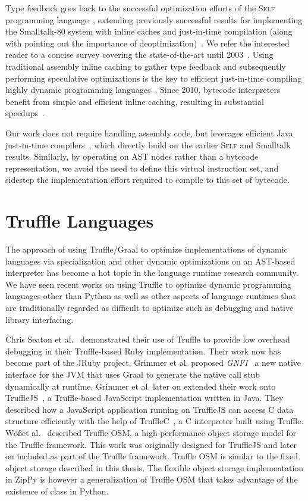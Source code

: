Type feedback goes back to the successful optimization efforts of the \textsc{Self} programming language~\cite{holzle.ungar+94,holzle+94}, extending previously successful results for implementing the Smalltalk-80 system with inline caches and just-in-time compilation (along with pointing out the importance of deoptimization)~\cite{Deutsch1984}.
We refer the interested reader to a concise survey covering the state-of-the-art until 2003~\cite{aycock+03}.
Using traditional assembly inline caching to gather type feedback and subsequently performing speculative optimizations is the key to efficient just-in-time compiling highly dynamic programming languages~\cite{chang.etal+11}.
Since 2010, bytecode interpreters benefit from simple and efficient inline caching, resulting in substantial speedups~\cite{Brunthaler2010inca,williams.etal+10}.

Our work does not require handling assembly code, but leverages efficient Java just-in-time compilers~\cite{kotzmann.etal+08,paleczny.etal+01,wimmer.franz+10}, which directly build on the earlier
\textsc{Self} and Smalltalk results. Similarly, by operating on AST nodes rather than a bytecode representation, we avoid the need to define this virtual instruction set, and sidestep the implementation effort required to compile to this set of bytecode.

\section{Truffle Languages}

The approach of using Truffle/Graal to optimize implementations of dynamic languages via specialization and other dynamic optimizations on an AST-based interpreter has become a hot topic in the language runtime research community.
We have seen recent works on using Truffle to optimize dynamic programming languages other than Python as well as other aspects of language runtimes that are traditionally regarded as difficult to optimize such as debugging and native library interfacing.

Chris Seaton et al.~\cite{seaton2014debugging} demonstrated their use of Truffle to provide low overhead debugging in their Truffle-based Ruby implementation.
Their work now has become part of the JRuby project.
Grimmer et al. proposed \emph{GNFI}~\cite{Grimmer+2013} a new native interface for the JVM that uses Graal to generate the native call stub dynamically at runtime.
Grimmer et al. later on extended their work onto TruffleJS~\cite{Grimmer+2014}, a Truffle-based JavaScript implementation written in Java.
They described how a JavaScript application running on TruffleJS can access C data structure efficiently with the help of TruffleC~\cite{Grimmer+2014TruffleC}, a C interpreter built using Truffle.
W\"{o}\ss et al.~\cite{WoB+2014} described Truffle OSM, a high-performance object storage model for the Truffle framework.
This work was originally designed for TruffleJS and later on included as part of the Truffle framework.
Truffle OSM is similar to the fixed object storage described in this thesis.
The flexible object storage implementation in ZipPy is however a generalization of Truffle OSM that takes advantage of the existence of class in Python.

